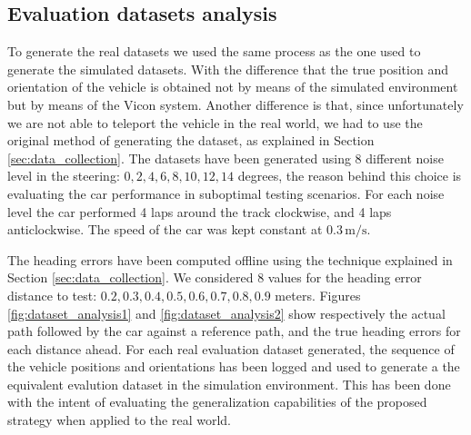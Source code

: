 \documentclass[a4paper,12pt,sort&compress]{article}
\begin{document}


\subsection{Evaluation datasets analysis}
To generate the real datasets we used the same process as the one used to generate the simulated
datasets. With the difference that the true position and orientation of the vehicle is obtained not
by means of the simulated environment but by means of the Vicon system. Another difference is that,
since unfortunately we are not able to teleport the vehicle in the real world, we had to use the
original method of generating the dataset, as explained in Section \ref{sec:data_collection}. The
datasets have been generated using 8 different noise level in the steering: $0, 2, 4, 6, 8, 10, 12,
14$ degrees, the reason behind this choice is evaluating the car performance in suboptimal testing
scenarios.  For each noise level the car performed 4 laps around the track clockwise, and 4 laps
anticlockwise. The speed of the car was kept constant at $0.3\,\si{\meter\per\second}$. 

The heading errors have been computed offline using the technique explained in Section
\ref{sec:data_collection}. We considered 8 values for the heading error distance to test: $0.2, 0.3,
0.4, 0.5, 0.6, 0.7, 0.8, 0.9$ meters.
Figures \ref{fig:dataset_analysis1} and \ref{fig:dataset_analysis2} show respectively the actual path followed by
the car against a reference path, and the true heading errors for each distance ahead.  %
For each real evaluation dataset generated, the sequence of the vehicle positions and orientations
has been logged and used to generate a the equivalent evalution dataset in the simulation
environment. This has been done with the intent of evaluating the generalization capabilities of the
proposed strategy when applied to the real world. 
\end{document}
